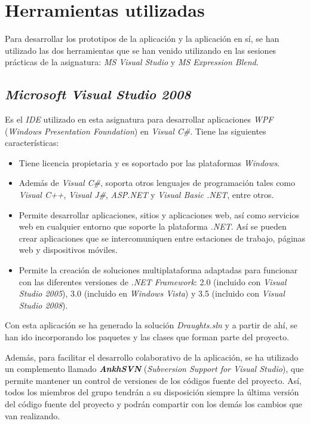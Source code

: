 \section{Herramientas utilizadas}
Para desarrollar los prototipos de la aplicación y la aplicación en sí, se han
utilizado las dos herramientas que se han venido utilizando en las sesiones
prácticas de la asignatura: \emph{MS Visual Studio} y
\emph{MS Expression Blend}.

\subsection{\emph{Microsoft Visual Studio 2008}}
Es el \emph{IDE} utilizado en esta asignatura para desarrollar aplicaciones
\emph{WPF} (\emph{Windows Presentation Foundation}) en \emph{Visual C\#}.
Tiene las siguientes características:
\begin{itemize}
\item Tiene licencia propietaria y es soportado por las plataformas
\emph{Windows}.
\item Además de \emph{Visual C\#}, soporta otros lenguajes de programación
tales como \emph{Visual C++}, \emph{Visual J\#}, \emph{ASP.NET} y
\emph{Visual Basic .NET}, entre otros.
\item Permite desarrollar aplicaciones, sitios y aplicaciones web, así como
servicios web en cualquier entorno que soporte la plataforma \emph{.NET}. Así
se pueden crear aplicaciones que se intercomuniquen entre estaciones de
trabajo, páginas web y dispositivos móviles.
\item Permite la creación de soluciones multiplataforma adaptadas para
funcionar con las diferentes versiones de \emph{.NET Framework}: 2.0
(incluido con \emph{Visual Studio 2005}), 3.0 (incluido en
\emph{Windows Vista}) y 3.5 (incluido con \emph{Visual Studio 2008}).
\end{itemize}

Con esta aplicación se ha generado la solución \emph{Draughts.sln} y a partir
de ahí, se han ido incorporando los paquetes y las clases que forman parte del
proyecto.

Además, para facilitar el desarrollo colaborativo de la aplicación, se ha
utilizado un complemento llamado \emph{\textbf{AnkhSVN}} (\emph{Subversion
Support for Visual Studio}), que permite mantener un control de versiones de
los códigos fuente del proyecto. Así, todos los miembros del grupo tendrán a su 
disposición siempre la última versión del código fuente del proyecto y podrán 
compartir con los demás los cambios que van realizando.

